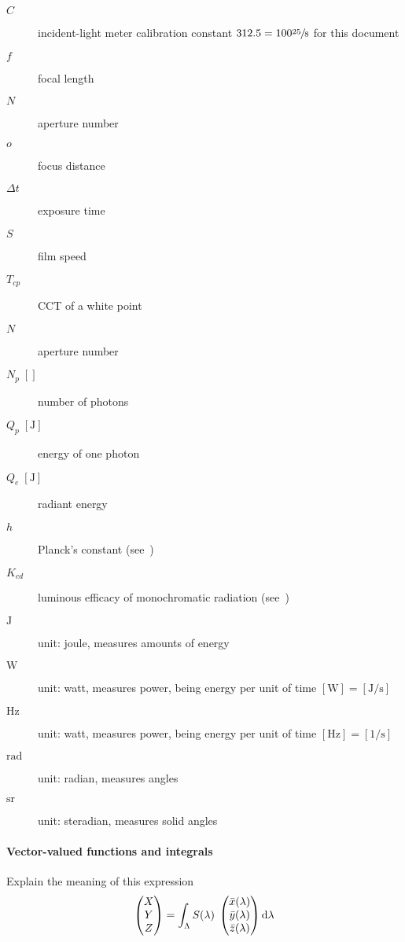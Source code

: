 \begin{description}
\item[{$C$}] incident-light meter calibration constant $312.5 = 100 \sfrac{25}8$ for this document
\item[{$f$}] focal length
\item[{$N$}] aperture number
\item[{$o$}] focus distance
\item[{$\Delta t$}] exposure time
\item[{$S$}] film speed
\item[{$T_{cp}$}] \gls{CCT} of a white point
\item[{$N$}] aperture number



\item[ {$N_p\;[]$} ] number of photons
\item[ {$Q_p\;[\unit\joule]$} ] energy of one photon
\item[ {$Q_e\;[\unit\joule]$} ] radiant energy


\item[ {$h$} ] Planck's constant (see~\cite{bipm:si.2019})
\item[ {$K_{cd}$} ] luminous efficacy of monochromatic radiation (see~\cite{bipm:si.2019})

\item[ {$\unit\joule$} ] unit: joule, measures amounts of energy
\item[ {$\unit\watt$} ] unit: watt, measures power, being energy per 
	unit of time $[\unit\watt] = [\unit{\joule\per\second}]$
\item[ {$\unit\hertz$} ] unit: watt, measures power, being energy per 
	unit of time $[\unit\hertz] = [\unit{1\per\second}]$
\item[ {$\unit\radian$} ] 	unit: radian, measures angles
\item[ {$\unit\steradian$} ] unit: steradian, measures solid angles
                   
\end{description}

\paragraph{Vector-valued functions and integrals}

\begin{inconstruction}
	Explain the meaning of this expression
	\begin{displaymath}
		\begin{pmatrix}X\\Y\\Z\end{pmatrix}
		= \int_\Lambda S(\lambda)\; 
		\begin{pmatrix}
			\bar x(\lambda)\\
			\bar y(\lambda)\\
			\bar z(\lambda)
		\end{pmatrix}
		\mathop{}\!\mathrm{d}\lambda
	\end{displaymath}
\end{inconstruction}


